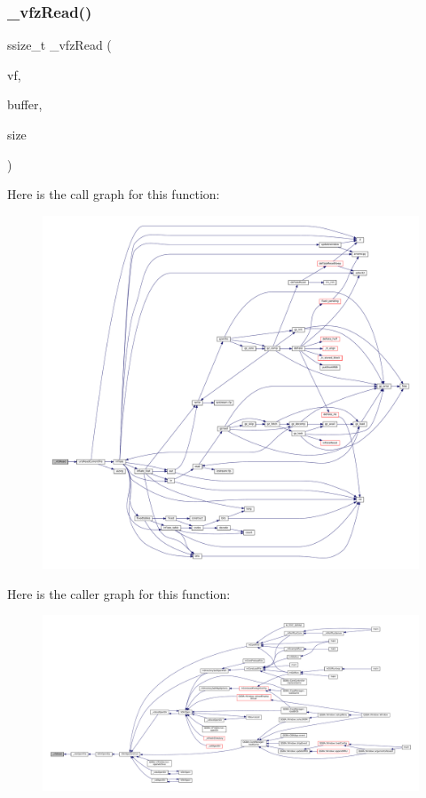 \subsubsection{\texorpdfstring{\+\_\+vfz\+Read()}{\_vfzRead()}}
{\footnotesize\ttfamily ssize\+\_\+t \+\_\+vfz\+Read (\begin{DoxyParamCaption}\item[{struct V\+File $\ast$}]{vf,  }\item[{void $\ast$}]{buffer,  }\item[{size\+\_\+t}]{size }\end{DoxyParamCaption})\hspace{0.3cm}{\ttfamily [static]}}

Here is the call graph for this function\+:
\nopagebreak
\begin{figure}[H]
\begin{center}
\leavevmode
\includegraphics[width=350pt]{vfs-zip_8c_a593e9a250e3d7aa9c3b94a1f7b9a8cca_cgraph}
\end{center}
\end{figure}
Here is the caller graph for this function\+:
\nopagebreak
\begin{figure}[H]
\begin{center}
\leavevmode
\includegraphics[width=350pt]{vfs-zip_8c_a593e9a250e3d7aa9c3b94a1f7b9a8cca_icgraph}
\end{center}
\end{figure}
\mbox{\label{vfs-zip_8c_a84d781da640055a7334040e6cde4dea2}} 
